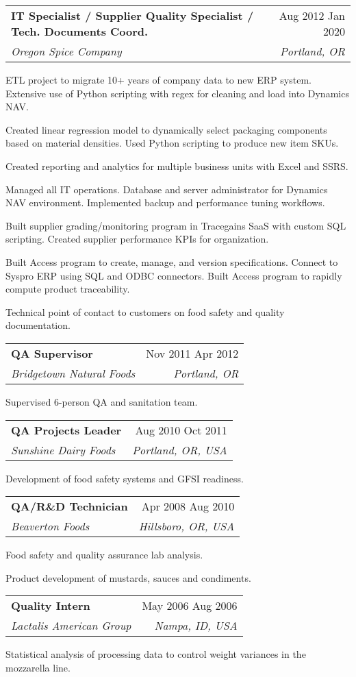\documentclass[letterpaper,12pt]{article}[leftmargin=*]
\makeatletter
\def\entryspacing{-0pt}
\newcommand{\resumeEntryStart}{\begin{itemize}[leftmargin=2.5mm]}
\newcommand{\resumeEntryEnd}{\end{itemize}\vspace{\entryspacing}}
\newcommand{\resumeItemListStart}{\begin{itemize}[leftmargin=4.5mm]}
\newcommand{\resumeItemListEnd}{\end{itemize}}
\newcommand{\resumeItem}[1]{
  \item\small{
    {#1 \vspace{-2pt}}
  }
}
\newcommand{\resumeEntryTSDL}[4]{
  \vspace{-1pt}\item[]
    \begin{tabularx}{0.97\textwidth}{X@{\hspace{60pt}}r}
      \textbf{\color{primary}#1} & {\firabook\color{accent}\small#2} \\
      \textit{\color{accent}\small#3} & \textit{\color{accent}\small#4} \\
    \end{tabularx}\vspace{-6pt}
}
\makeatother
\begin{document}
\resumeEntryStart{
  \resumeEntryTSDL{IT Specialist / Supplier Quality Specialist / Tech. Documents Coord.}{Aug 2012 \textemdash{} Jan 2020}{Oregon Spice Company}{Portland, OR}
  \resumeItemListStart{
    \resumeItem{ETL project to migrate 10+ years of company data to new ERP system. Extensive use of Python scripting with regex for cleaning and load into Dynamics NAV.}
    \resumeItem{Created linear regression model to dynamically select packaging components based on material densities. Used Python scripting to produce new item SKUs.}
    \resumeItem{Created reporting and analytics for multiple business units with Excel and SSRS.}
    \resumeItem{Managed all IT operations. Database and server administrator for Dynamics NAV environment. Implemented backup and performance tuning workflows.}
    \resumeItem{Built supplier grading/monitoring program in Tracegains SaaS with custom SQL scripting. Created supplier performance KPIs for organization.}
    \resumeItem{Built Access program to create, manage, and version specifications. Connect to Syspro ERP using SQL and ODBC connectors. Built Access program to rapidly compute product traceability.}
    \resumeItem{Technical point of contact to customers on food safety and quality documentation.}}
  \resumeItemListEnd}
\resumeEntryEnd{}

\resumeEntryStart{
  \resumeEntryTSDL{QA Supervisor}{Nov 2011 \textemdash{} Apr 2012}{Bridgetown Natural Foods}{Portland, OR}
  \resumeItemListStart{
    \resumeItem{Supervised 6-person QA and sanitation team.}}
  \resumeItemListEnd{}}
\resumeEntryEnd{}

\resumeEntryStart{
  \resumeEntryTSDL{QA Projects Leader}{Aug 2010 \textemdash{} Oct 2011}{Sunshine Dairy Foods}{Portland, OR, USA}
  \resumeItemListStart{
    \resumeItem{Development of food safety systems and GFSI readiness.}}
  \resumeItemListEnd{}}
\resumeEntryEnd{}

\resumeEntryStart{
  \resumeEntryTSDL{QA/R\&D Technician}{Apr 2008 \textemdash{} Aug 2010}{Beaverton Foods}{Hillsboro, OR, USA}
  \resumeItemListStart{
    \resumeItem{Food safety and quality assurance lab analysis.}
    \resumeItem{Product development of mustards, sauces and condiments.}}
  \resumeItemListEnd{}}
\resumeEntryEnd{}

\resumeEntryStart{
  \resumeEntryTSDL{Quality Intern}{May 2006 \textemdash{} Aug 2006}{Lactalis American Group}{Nampa, ID, USA}
  \resumeItemListStart{
    \resumeItem{Statistical analysis of processing data to control weight variances in the mozzarella line.}}
  \resumeItemListEnd{}}
\resumeEntryEnd{}
\end{document}
